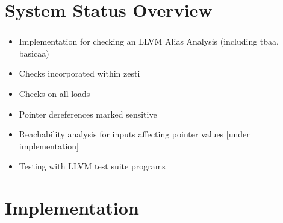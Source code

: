\documentclass[mathserif,10pt]{beamer}
\newcommand{\cmt}[1]{}
\begin{document}
\section{System Status Overview}
\frame
{
  \frametitle{\secname}
  \begin{itemize} [<+->]
    \cmt{
      As it mentioned that we are trying to device a debugger for  static analysis. The static analysis 
        that we are currently dealing with is pointer analysis
    }
    \item Implementation for checking an LLVM Alias Analysis (including tbaa, basicaa)
    \vspace{1cm}
    \item Checks incorporated within zesti
    \vspace{1cm}
    \item Checks on all loads
    \vspace{1cm}
    \item Pointer dereferences marked sensitive
    \vspace{1cm}
    \item Reachability analysis for inputs affecting pointer values [under implementation]
    \vspace{1cm}
    \item Testing with LLVM test suite programs
  \end{itemize} 
}

\section{Implementation}
\end{document}
